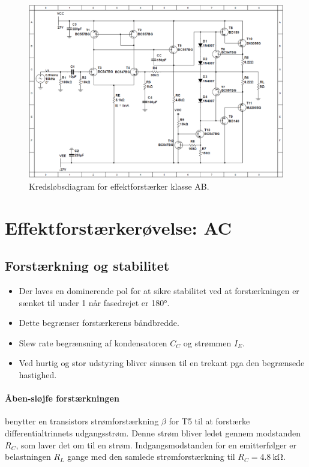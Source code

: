 \documentclass[danish]{article}
\begin{document}
\begin{figure} [H]
	\centering
	\includegraphics[width=\linewidth]{graphics/PowerAmp_schematic}
	\caption{Kredsløbsdiagram for effektforstærker klasse AB.}
	\label{fig:PowerAmp_schematic}
\end{figure}

\newpage
\section{Effektforstærkerøvelse: AC}

\subsection{Forstærkning og stabilitet}
\begin{itemize}
	\item Der laves en dominerende pol for at sikre stabilitet ved at forstærkningen er sænket til under 1 når fasedrejet er 180°.
	\item Dette begrænser forstærkerens båndbredde.
	\item Slew rate begrænsning af kondensatoren $C_C$ og strømmen $I_E$.
	\item Ved hurtig og stor udstyring bliver sinusen til en trekant pga den begrænsede hastighed.
\end{itemize}

\paragraph{Åben-sløjfe forstærkningen} benytter en transistors strømforstærkning $\beta$ for T5 til at forstærke differentialtrinnets udgangsstrøm. Denne strøm bliver ledet gennem modstanden $R_C$, som laver det om til en strøm. 
Indgangsmodstanden for en emitterfølger er belastningen $R_L$ gange med den samlede strømforstærkning til $R_C = \SI{4.8}{\kilo\ohm}$.
\end{document}
